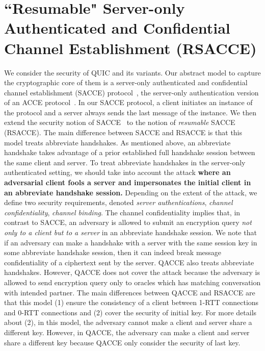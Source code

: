 \section{``Resumable" Server-only Authenticated and Confidential Channel Establishment (RSACCE)} \label{sec:rsacce}
We consider the security of QUIC and its variants.
Our abstract model to capture the cryptographic core
of them is a server-only authenticated and confidential
channel establishment (SACCE) protocol~\cite{KPW13:SACCE},
the server-only authentication version of an ACCE
protocol~\cite{JKSS12:ACCE}.
In our SACCE protocol, a client initiates an instance
of the protocol and a server always sends the last
message of the instance.
We then extend the security notion of
SACCE~\cite{KPW13:SACCE} to the notion of
\textit{resumable} SACCE (RSACCE).
The main difference between SACCE and RSACCE is that this model treats
abbreviate handshakes.
As mentioned above, an abbreviate handshake takes
advantage of a prior established full handshake session
between the same client and server.
To treat abbreviate handshakes in the server-only
authenticated setting, we should take into account the
attack
\textbf{where an adversarial client fools a
server and impersonates the initial client in an
abbreviate handshake session.}
Depending on the extent of the attack, we define two
security requirements, denoted
\textit{server authentications},
\textit{channel confidentiality}, \textit{channel binding}.
The channel confidentiality implies that, in contrast
to SACCE, an adversary is allowed to submit an
encryption query
\textit{not only to a client but to a server} in an
abbreviate handshake session.
We note that if an adversary can make a handshake with
a server with the same session key in some abbreviate
handshake session, then it can indeed break message
confidentiality of a ciphertext sent by the server.
QACCE also treats abbreviate handshakes.
However, QACCE does not cover the attack because the
adversary is allowed to send encryption query only to
oracles which has matching conversation with intended
partner.
The main differences between QACCE and RSACCE are that
this model (1) ensure the consistency of a client between
1-RTT connections and 0-RTT connections and (2) cover the
security of initial key.
For more details about (2), in this model, the adversary
cannot make a client and server share a different key.
However, in QACCE, the adversary can make a client and
server share a different key because QACCE only consider
the security of last key.

